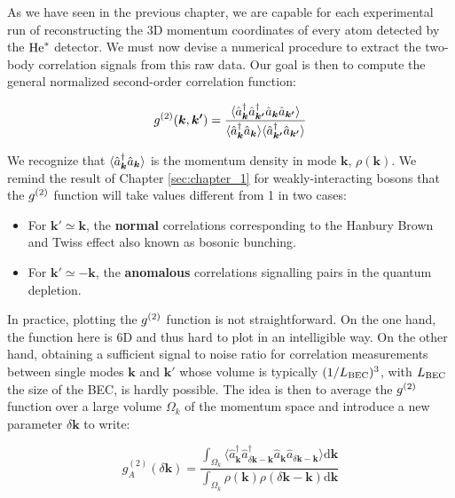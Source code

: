 As we have seen in the previous chapter, we are capable for each experimental run of reconstructing the 3D momentum coordinates of every atom detected by the $\mathrm{He}^*$ detector. We must now devise a numerical procedure to extract the two-body correlation signals from this raw data. Our goal is then to compute the general normalized second-order correlation function:

\begin{equation}
    g^{(2)} (\bm{k},\bm{k'}) = \frac{\langle\hat{a}^{\dagger}_{\bm{k}} \hat{a}^{\dagger}_{\bm{k'}} \hat{a}_{\bm{k}} \hat{a}_{\bm{k'}}\rangle}{\langle\hat{a}^{\dagger}_{\bm{k}} \hat{a}_{\bm{k}}\rangle \langle\hat{a}^{\dagger}_{\bm{k'}} \hat{a}_{\bm{k'}} \rangle}
\end{equation}

\noindent We recognize that $\langle\hat{a}^{\dagger}_{\bm{k}} \hat{a}_{\bm{k}}\rangle$ is the momentum density in mode $\bm{k}$, $\rho(\bm{k})$. We remind the result of Chapter \ref{sec:chapter_1} for weakly-interacting bosons that the $g^{(2)}$ function will take values different from 1 in two cases:

\begin{itemize}
    \item For $\bm{k'} \simeq \bm{k}$, the \textbf{normal} correlations corresponding to the Hanbury Brown and Twiss effect also known as bosonic bunching.
    \item For $\bm{k'} \simeq -\bm{k}$, the \textbf{anomalous} correlations signalling \kmk pairs in the quantum depletion.
\end{itemize}

In practice, plotting the $g^{(2)}$ function is not straightforward. On the one hand, the function here is 6D and thus hard to plot in an intelligible way. On the other hand, obtaining a sufficient signal to noise ratio for correlation measurements between single modes $\bm{k}$ and $\bm{k'}$ whose volume is typically $(1/L_{\rm{BEC}})^3$, with $L_{\rm{BEC}}$ the size of the BEC, is hardly possible. The idea is then to average the $g^{(2)}$ function over a large volume $\Omega_k$ of the momentum space and introduce a new parameter $\delta \bm{k}$ to write:

\begin{equation}
    g_{A}^{(2)} (\delta {\bm k})=\frac{\int_{\Omega_{k}} \langle \hat{a}^{\dagger}_{\bm k} \hat{a}^{\dagger}_{\delta {\bm k} - {\bm k}} \hat{a}_{\bm k} \hat{a}_{\delta {\bm k} - {\bm k}} \rangle \mathrm{d}{\bm k}}{\int_{\Omega_{k}} \rho(\bm k) \rho(\delta {\bm k} - {\bm k}) \mathrm{d}\bm{k}}
    \label{Eq:g2_anomalous}
\end{equation}

